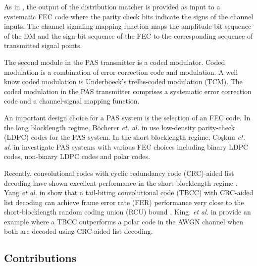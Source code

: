 \documentclass [PhD] {uclathes}
\begin{document}
As in \cite{pas_bocherer_1,pas_bocherer_2}, the output of the distribution matcher is provided as input to a systematic FEC code where the parity check bits indicate the signs of the channel inputs. The channel-signaling mapping function maps the amplitude-bit sequence of the DM and the sign-bit sequence of the FEC to the corresponding sequence of transmitted signal points.

The second module in the PAS transmitter is a coded modulator. Coded modulation is a combination of error correction code and modulation. A well know coded modulation is Underboeck's trellis-coded modulation (TCM)\cite{ungerboeck1982channel}.   The coded modulation in the PAS transmitter \cite{pas_achievablerate_bocherer} comprises a systematic error correction code and a channel-signal mapping function.

An important design choice for a PAS system is the selection of an FEC code. In the long blocklength regime, B{\"o}cherer \emph{et. al.} in \cite{pas_bocherer_1} use low-density parity-check (LDPC) codes for the PAS system. In the short blocklength regime, Coşkun \emph{et. al.} in \cite{cocskun2019efficient} investigate PAS systems with various FEC choices including binary LDPC codes, non-binary LDPC codes and polar codes. 

Recently, convolutional codes with cyclic redundancy code (CRC)-aided list decoding have shown excellent performance in the short blocklength regime \cite{Liang_tbcccrc,yang2018serial,yang2019list,9709319}. Yang \textit{et al.} in \cite{Liang_tbcccrc} show that a tail-biting convolutional code (TBCC) with CRC-aided list decoding can achieve frame error rate (FER) performance very close to the short-blocklength random coding union (RCU) bound \cite{polyrcu}. King.  \textit{et al.} in \cite{king2022crc} provide an example where a TBCC outperforms a polar code in the AWGN channel when both are decoded using CRC-aided list decoding.

\subsection{Contributions}
\end{document}
